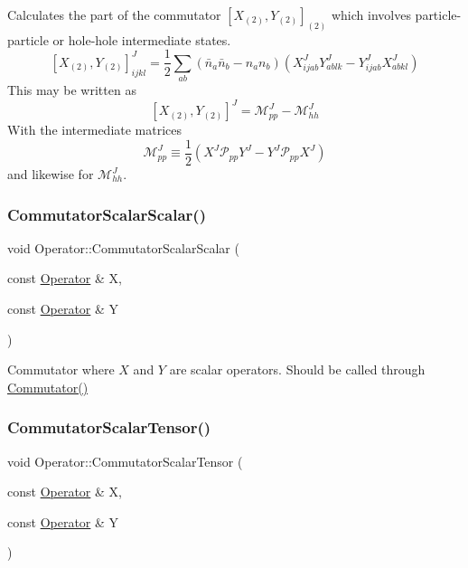 Calculates the part of the commutator $ [X_{(2)},Y_{(2)}]_{(2)} $ which involves particle-\/particle or hole-\/hole intermediate states. \[ [X_{(2)},Y_{(2)}]^{J}_{ijkl} = \frac{1}{2} \sum_{ab} (\bar{n}_a\bar{n}_b - n_an_b) (X^{J}_{ijab}Y^{J}_{ablk} - Y^{J}_{ijab}X^{J}_{abkl}) \] This may be written as \[ [X_{(2)},Y_{(2)}]^{J} = \mathcal{M}^{J}_{pp} - \mathcal{M}^{J}_{hh} \] With the intermediate matrices \[ \mathcal{M}^{J}_{pp} \equiv \frac{1}{2}(X^{J} \mathcal{P}_{pp} Y^{J} - Y^{J} \mathcal{P}_{pp} X^{J}) \] and likewise for $ \mathcal{M}^{J}_{hh} $. \mbox{\label{classOperator_a93daa0fe076a64408773a65d66c6f14d}} 
\subsubsection{\texorpdfstring{Commutator\+Scalar\+Scalar()}{CommutatorScalarScalar()}}
{\footnotesize\ttfamily void Operator\+::\+Commutator\+Scalar\+Scalar (\begin{DoxyParamCaption}\item[{const \hyperlink{classOperator}{Operator} \&}]{X,  }\item[{const \hyperlink{classOperator}{Operator} \&}]{Y }\end{DoxyParamCaption})}

Commutator where $ X $ and $Y$ are scalar operators. Should be called through \hyperlink{classOperator_a88b0cafa371bca287379a0ce89627e2b}{Commutator()} \mbox{\label{classOperator_a07b286db306e5bb11c6d897bc3a199c8}} 
\subsubsection{\texorpdfstring{Commutator\+Scalar\+Tensor()}{CommutatorScalarTensor()}}
{\footnotesize\ttfamily void Operator\+::\+Commutator\+Scalar\+Tensor (\begin{DoxyParamCaption}\item[{const \hyperlink{classOperator}{Operator} \&}]{X,  }\item[{const \hyperlink{classOperator}{Operator} \&}]{Y }\end{DoxyParamCaption})}

